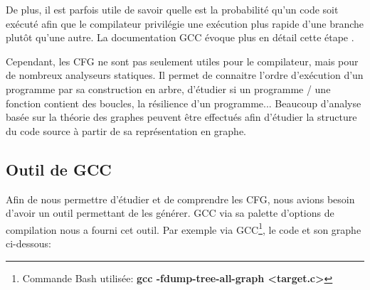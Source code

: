 De plus, il est parfois utile de savoir quelle est la probabilité qu'un code soit exécuté afin que le compilateur privilégie une exécution plus rapide d'une branche plutôt qu'une autre. La documentation GCC évoque plus en détail cette étape \cite{gcc:cfg}.

Cependant, les CFG ne sont pas seulement utiles pour le compilateur, mais pour de nombreux analyseurs statiques. Il permet de connaitre l'ordre d'exécution d'un programme par sa construction en arbre, d'étudier si un programme / une fonction contient des boucles, la résilience d'un programme... Beaucoup d'analyse basée sur la théorie des graphes peuvent être effectués afin d'étudier la structure du code source à partir de sa représentation en graphe.

\subsection{Outil de GCC}
Afin de nous permettre d'étudier et de comprendre les CFG, nous avions besoin d'avoir un outil permettant de les générer. GCC via sa palette d'options de compilation nous a fourni cet outil. Par exemple via GCC\footnote{Commande Bash utilisée: \textbf{gcc -fdump-tree-all-graph <target.c>}}, le code et son graphe ci-dessous:
